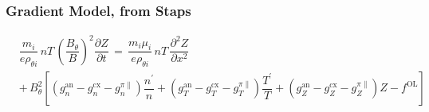 \documentclass[a4paper,8pt]{article}
\begin{document}
\normalsize

\subsubsection{Gradient Model, from
Staps}\label{gradient-model-from-staps}

\small

\begin{align}
    &\dfrac{m_i}{e \rho_{\theta i}} \,n T\, \left(\dfrac{B_\theta}{B}\right)^2 \dfrac{\partial Z}{\partial t} \,=\, \dfrac{m_i \mu_i}{e \rho_{\theta i}} \,n T\, \dfrac{\partial^2 Z}{\partial x^2} \\
    &+\, B_\theta^2 \left[\left(g_n^\text{an} - g_n^\text{cx} - g_n^{\pi\parallel}\right) \dfrac{n^\prime}{n} + \left(g_T^\text{an} - g_T^\text{cx} - g_T^{\pi\parallel}\right) \dfrac{T^\prime}{T} + \left(g_Z^\text{an} - g_Z^\text{cx} - g_Z^{\pi\parallel}\right) Z - f^\text{OL}\right]
\end{align}

\normalsize
\end{document}
